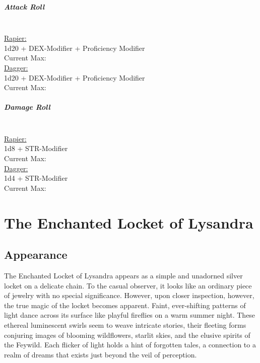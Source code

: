 \documentclass[letterpaper,openany,oneside,twocolumn]{book}
\begin{document}
\paragraph*{Attack Roll}\hfill\\
\underline{Rapier:}\\
1d20 + DEX-Modifier + Proficiency Modifier\\
\indent Current Max: \\
\underline{Dagger:}\\
1d20 + DEX-Modifier + Proficiency Modifier\\
\indent Current Max: 
\paragraph*{Damage Roll}\hfill\\
\underline{Rapier:}\\
1d8 + STR-Modifier\\
\indent Current Max: \\
\underline{Dagger:}\\
1d4 + STR-Modifier\\
\indent Current Max: 

\newpage
\chapter*{The Enchanted Locket of Lysandra}
\vspace*{10cm}
\section*{Appearance}
The Enchanted Locket of Lysandra appears as a simple and unadorned silver locket on a delicate chain. To the casual observer, it looks like an ordinary piece of jewelry with no special significance. However, upon closer inspection, however, the true magic of the locket becomes apparent. Faint, ever-shifting patterns of light dance across its surface like playful fireflies on a warm summer night. These ethereal luminescent swirls seem to weave intricate stories, their fleeting forms conjuring images of blooming wildflowers, starlit skies, and the elusive spirits of the Feywild. Each flicker of light holds a hint of forgotten tales, a connection to a realm of dreams that exists just beyond the veil of perception.
\end{document}
